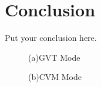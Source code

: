 \documentclass{article}
\begin{document}
%

%

\section{Conclusion}
\label{sec:conclusion}

Put your conclusion here.


\begin{figure}
\begin{minipage}[a]{.48\linewidth}
  \centering
\centerline{}
  \centerline{(a)GVT Mode }\medskip
\end{minipage}
\hfill
\begin{minipage}[b]{0.48\linewidth}
  \centering
\centerline{}
  \centerline{(b)CVM Mode }\medskip
\end{minipage}
%
\caption{}
\label{fig:res}
%
\end{figure}




%
\end{document}
